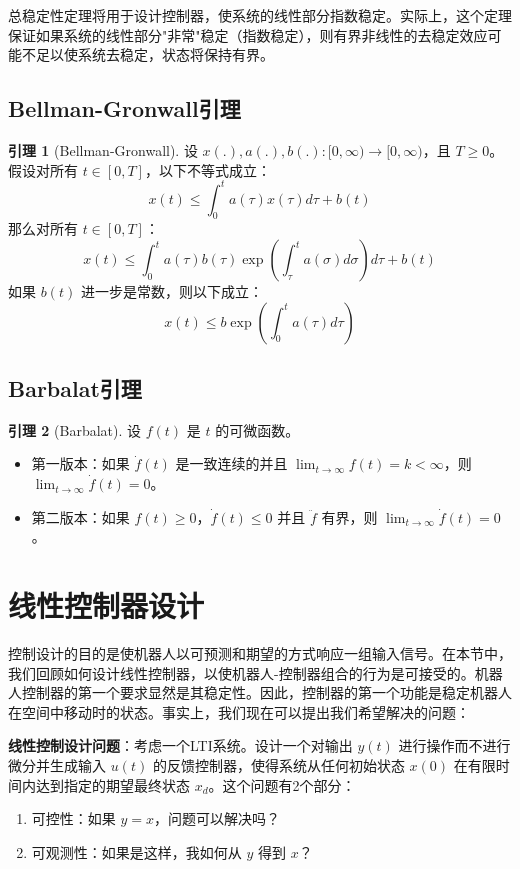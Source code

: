 \documentclass[UTF8,12pt,a4paper]{ctexart}
\theoremstyle{definition}
\newtheorem{lemma}{引理}[section]
\begin{document}
总稳定性定理将用于设计控制器，使系统的线性部分指数稳定。实际上，这个定理保证如果系统的线性部分"非常"稳定（指数稳定），则有界非线性的去稳定效应可能不足以使系统去稳定，状态将保持有界。

\subsection{Bellman-Gronwall引理}

\begin{lemma}[Bellman-Gronwall]
设 $x(.), a(.), b(.): [0, \infty) \rightarrow [0, \infty)$，且 $T \geq 0$。假设对所有 $t \in [0, T]$，以下不等式成立：
\[
x(t) \leq \int_0^t a(\tau)x(\tau)d\tau + b(t)
\]
那么对所有 $t \in [0, T]$：
\[
x(t) \leq \int_0^t a(\tau)b(\tau)\exp\left(\int_\tau^t a(\sigma)d\sigma\right)d\tau + b(t)
\]
如果 $b(t)$ 进一步是常数，则以下成立：
\[
x(t) \leq b \exp\left(\int_0^t a(\tau)d\tau\right)
\]
\end{lemma}

\subsection{Barbalat引理}

\begin{lemma}[Barbalat]
设 $f(t)$ 是 $t$ 的可微函数。
\begin{itemize}
\item 第一版本：如果 $\dot{f}(t)$ 是一致连续的并且 $\lim_{t \rightarrow \infty} f(t) = k < \infty$，则 $\lim_{t \rightarrow \infty} \dot{f}(t) = 0$。
\item 第二版本：如果 $f(t) \geq 0$，$\dot{f}(t) \leq 0$ 并且 $\ddot{f}$ 有界，则 $\lim_{t \rightarrow \infty} \dot{f}(t) = 0$。
\end{itemize}
\end{lemma}

\section{线性控制器设计}

控制设计的目的是使机器人以可预测和期望的方式响应一组输入信号。在本节中，我们回顾如何设计线性控制器，以使机器人-控制器组合的行为是可接受的。机器人控制器的第一个要求显然是其稳定性。因此，控制器的第一个功能是稳定机器人在空间中移动时的状态。事实上，我们现在可以提出我们希望解决的问题：

\textbf{线性控制设计问题}：考虑一个LTI系统。设计一个对输出 $y(t)$ 进行操作而不进行微分并生成输入 $u(t)$ 的反馈控制器，使得系统从任何初始状态 $x(0)$ 在有限时间内达到指定的期望最终状态 $x_d$。这个问题有2个部分：
\begin{enumerate}
\item 可控性：如果 $y=x$，问题可以解决吗？
\item 可观测性：如果是这样，我如何从 $y$ 得到 $x$？
\end{enumerate}
\end{document}
